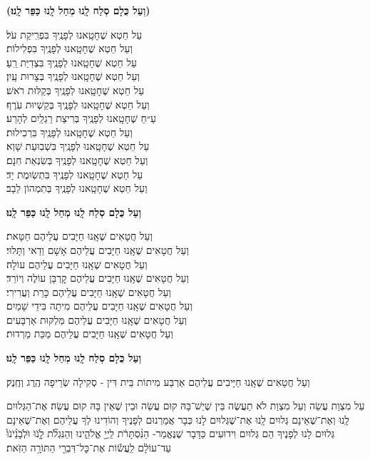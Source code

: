 \documentclass[twoside, openany, parskip=half, 11pt]{book}
\begin{document}
\textbf{(וְעַל כֻּלָם סְלַח לָֽנוּ מְחַל לָֽנוּ כַּפֵּר לָֽנוּ׃)}

עַל חֵטְא שֶׁחָטָֽאנוּ לְפָנֶֽיךָ בִּפְרִֽיקַת עֹל׃\\ וְעַל חֵטְא שֶׁחָטָֽאנוּ לְפָנֶֽיךָ בִּפְלִילוֹת׃ \\
עַל חֵטְא שֶׁחָטָֽאנוּ לְפָנֶֽיךָ בִּצְדִיַּת רֵֽעַ׃ \\ וְעַל חֵטְא שֶׁחָטָֽאנוּ לְפָנֶֽיךָ בְּצָרוּת עָֽיִן׃ \\
עַל חֵטְא שֶׁחָטָֽאנוּ לְפָנֶֽיךָ בְּקַלּוּת רֹאשׁ׃\\ וְעַל חֵטְא שֶׁחָטָֽאנוּ לְפָנֶֽיךָ בְּקַשְׁיוּת עֹֽרֶף׃ \\
עַ״חֵ שֶׁחָטָֽאנוּ לְפָנֶֽיךָ בְּרִיצַת רַגְלַֽיִם לְהָרַע׃\\ וְעַל חֵטְא שֶׁחָטָֽאנוּ לְפָנֶֽיךָ בִּרְכִילוּת׃ \\
עַל חֵטְא שֶׁחָטָֽאנוּ לְפָנֶֽיךָ בִּשְׁבֽוּעַת שָׁוְא׃ \\ וְעַל חֵטְא שֶׁחָטָֽאנוּ לְפָנֶֽיךָ בְּשִׂנְאַת חִנָם׃ \\
עַל חֵטְא שֶׁחָטָֽאנוּ לְפָנֶֽיךָ בִּתְשֽׂוּמֶת יָד׃\\ וְעַל חֵטְא שֶׁחָטָֽאנוּ לְפָנֶֽיךָ בְּתִמְהוֹן לֵבָב׃

\textbf{וְעַל כֻּלָם סְלַח לָֽנוּ מְחַל לָֽנוּ כַּפֵּר לָֽנוּ׃}


וְעַל חֲטָאִים שֶׁאָֽנוּ חַיָּבִים עֲלֵיהֶם חַטָּאת׃\\
וְעַל חֲטָאִים שֶׁאָֽנוּ חַיָּבִים עֲלֵיהֶם אָשָׁם וַדַאי וְתָּלוּי׃\\
וְעַל חֲטָאִים שֶׁאָֽנוּ חַיָּבִים עֲלֵיהֶם עוֹלָה׃\\
וְעַל חֲטָאִים שֶׁאָֽנוּ חַיָּבִים עֲלֵיהֶם קׇרְבָּן עוֹלֶה וְיוֹרֵד׃\\
וְעַל חֲטָאִים שֶׁאָֽנוּ חַיָּבִים עֲלֵיהֶם כָּרֵת וְעֲרִירִי׃\\
וְעַל חֲטָאִים שֶׁאָֽנוּ חַיָּבִים עֲלֵיהֶם מִיתָה בִּידֵי שָׁמַיִם׃\\
וְעַל חֲטָאִים שֶׁאָֽנוּ חַיָּבִים עֲלֵיהֶם מַּלְקּוּת אַרְבָּעִים׃\\
וְעַל חֲטָאִים שֶׁאָֽנוּ חַיָּבִים עֲלֵיהֶם מַכַּת מַרְדוּת׃



\textbf{וְעַל כֻּלָם סְלַח לָֽנוּ מְחַל לָֽנוּ כַּפֵּר לָֽנוּ׃}

וְעַל חֲטָאִים שֶׁאָֽנוּ חַיָּיבִים עֲלֵיהֶם אַרְבַּע מִיתוֹת בֵּית דִּין - סְקִילָה שְׂרֵיפָה הֶֽרֶג וְחֶֽנֶק׃

עַל מִצְוַת עֲשֵׂה וְעַל מִצְוַת לֹא תַעֲשֶׂה בֵּין שֶׁיֵשׁ־בָּהּ קוּם עֲשֵׂה וּבֵין שֶׁאֵין בָּהּ קוּם עֲשֵׂה׃ אֶת־הַגְּלוּיִם לָֽנוּ וְאֶת־שֶׁאֵינָם גְּלוּיִם לָֽנוּ אֶת־שֶׁגְּלוּיִם לָנוּ כְּבָר אֲמַרְנוּם לְפָנֶיךָ וְהוֹדִינוּ לְךָ עֲלֵיהֶם וְאֶת־שֶׁאֵינָם גְּלוּיִם לָנוּ לְפָנֶיךָ הֵם גְּלוּיִם וִידוּעִים כַּדָּבָר שֶׁנֶּאֱמַר- הַנִּ֨סְתָּרֹ֔ת
לַֽיְיָ֖ אֱלֹהֵ֑ינוּ וְהַנִּגְלֹ֞ת לָֹ֤נֹוֹּ וֹּלְֹבָֹנֵֹ֨יֹנֹוֹּ֙ עַד־עוֹלָ֔ם לַֽעֲשׂ֕וֹת אֶת־כׇּל־דִּבְרֵ֖י הַתּוֹרָ֥ה הַזֹּֽאת׃
\end{document}
